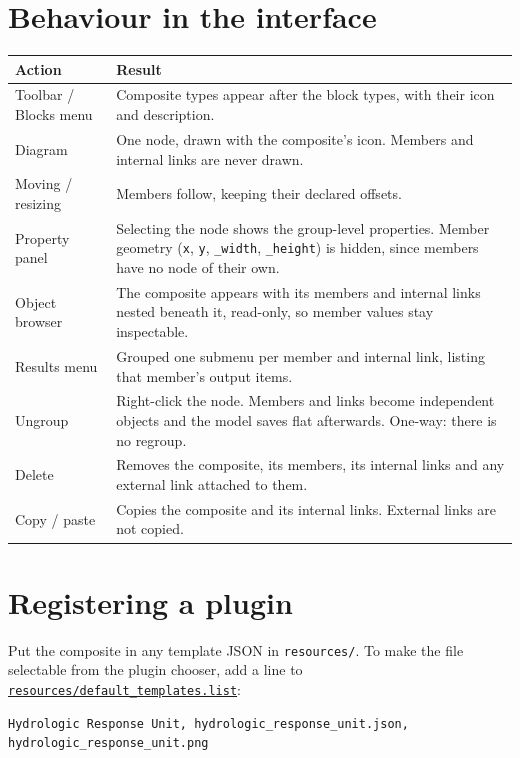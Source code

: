 \documentclass[11pt,a4paper]{article}
\newcommand{\code}[1]{\texttt{\small #1}}
\newcommand{\file}[1]{\texttt{\small #1}}
\newcommand{\ghbase}{https://github.com/ArashMassoudieh/OpenHydroQual/blob/master}
\newcommand{\exfile}[1]{\href{\ghbase/#1}{\file{#1}}}
\begin{document}
\section{Behaviour in the interface}

\begin{longtable}{@{}p{}p{}@{}}
\toprule
\textbf{Action} & \textbf{Result}\\
\midrule
\endhead
Toolbar / Blocks menu & Composite types appear after the block types, with
their icon and description.\\
Diagram & One node, drawn with the composite's icon. Members and internal links
are never drawn.\\
Moving / resizing & Members follow, keeping their declared offsets.\\
Property panel & Selecting the node shows the group-level properties. Member
geometry (\code{x}, \code{y}, \code{\_width}, \code{\_height}) is hidden, since
members have no node of their own.\\
Object browser & The composite appears with its members and internal links
nested beneath it, read-only, so member values stay inspectable.\\
Results menu & Grouped one submenu per member and internal link, listing that
member's output items.\\
Ungroup & Right-click the node. Members and links become independent objects
and the model saves flat afterwards. One-way: there is no regroup.\\
Delete & Removes the composite, its members, its internal links and any
external link attached to them.\\
Copy / paste & Copies the composite and its internal links. External links are
not copied.\\
\bottomrule
\end{longtable}

\section{Registering a plugin}\label{sec:register}

Put the composite in any template JSON in \file{resources/}. To make the file
selectable from the plugin chooser, add a line to
\exfile{resources/default\_templates.list}:

\begin{lstlisting}[style=plain]
Hydrologic Response Unit, hydrologic_response_unit.json, hydrologic_response_unit.png
\end{lstlisting}
\end{document}

